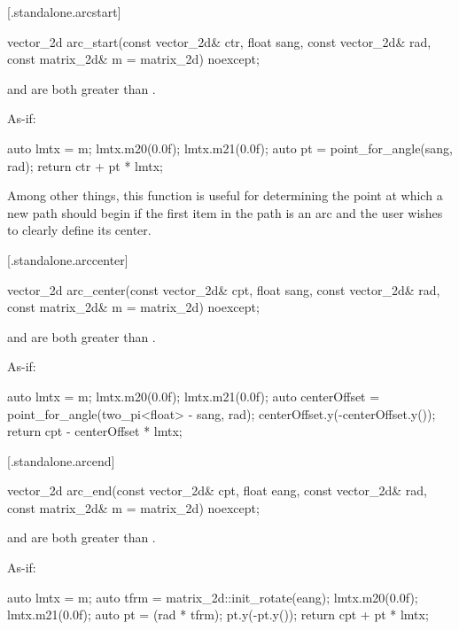  [\iotwod.standalone.arcstart] {}

%
\begin{itemdecl}
vector_2d arc_start(const vector_2d& ctr, float sang, const vector_2d& rad, 
  const matrix_2d& m = matrix_2d{}) noexcept;
\end{itemdecl}
\begin{itemdescr}
\pnum
\requires
{} and  are both greater than .

\pnum
\returns
As-if:
\begin{codeblock}
auto lmtx = m;
lmtx.m20(0.0f); lmtx.m21(0.0f);
auto pt = point_for_angle(sang, rad);
return ctr + pt * lmtx;
\end{codeblock}

\pnum
\begin{note}
Among other things, this function is useful for determining the point at which a new path should begin if the first item in the path is an arc and the user wishes to clearly define its center.
\end{note}
\end{itemdescr}

 [\iotwod.standalone.arccenter] {}

%
\begin{itemdecl}
vector_2d arc_center(const vector_2d& cpt, float sang, const vector_2d& rad, 
  const matrix_2d& m = matrix_2d{}) noexcept;
\end{itemdecl}
\begin{itemdescr}
\pnum
\requires
{} and  are both greater than .

\pnum
\returns
As-if:
\begin{codeblock}
auto lmtx = m;
lmtx.m20(0.0f); lmtx.m21(0.0f);
auto centerOffset = point_for_angle(two_pi<float> - sang, rad);
centerOffset.y(-centerOffset.y());
return cpt - centerOffset * lmtx;
\end{codeblock}
\end{itemdescr}

 [\iotwod.standalone.arcend] {}

%
\begin{itemdecl}
vector_2d arc_end(const vector_2d& cpt, float eang, const vector_2d& rad, 
  const matrix_2d& m = matrix_2d{}) noexcept;
\end{itemdecl}
\begin{itemdescr}
\pnum
\requires
{} and  are both greater than .

\pnum
\returns
As-if:
\begin{codeblock}
auto lmtx = m;
auto tfrm = matrix_2d::init_rotate(eang);
lmtx.m20(0.0f); lmtx.m21(0.0f);
auto pt = (rad * tfrm);
pt.y(-pt.y());
return cpt + pt * lmtx;
\end{codeblock}
\end{itemdescr}
